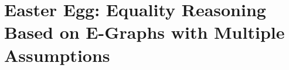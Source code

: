 \chapter{Easter Egg: Equality Reasoning Based on E-Graphs with Multiple Assumptions}
\label{chap:colors}
\label{chap:colored-egraph}







% 